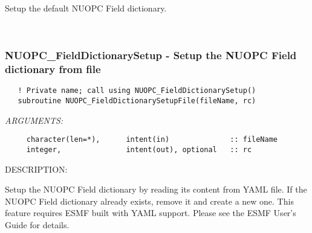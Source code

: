      Setup the default NUOPC Field dictionary. 
 
\mbox{}\hrulefill\ 
 
\subsubsection [NUOPC\_FieldDictionarySetup] {NUOPC\_FieldDictionarySetup - Setup the NUOPC Field dictionary from file}


\begin{verbatim}   ! Private name; call using NUOPC_FieldDictionarySetup()
   subroutine NUOPC_FieldDictionarySetupFile(fileName, rc)\end{verbatim}{\em ARGUMENTS:}
\begin{verbatim}     character(len=*),      intent(in)              :: fileName
     integer,               intent(out), optional   :: rc\end{verbatim}
{\sf DESCRIPTION:\\ }


     Setup the NUOPC Field dictionary by reading its content from YAML file.
     If the NUOPC Field dictionary already exists, remove it and create a new one.
     This feature requires ESMF built with YAML support. Please see the
     ESMF User's Guide for details.
\setlength{\parskip}{\oldparskip}
\setlength{\parindent}{\oldparindent}
\setlength{\baselineskip}{\oldbaselineskip}
